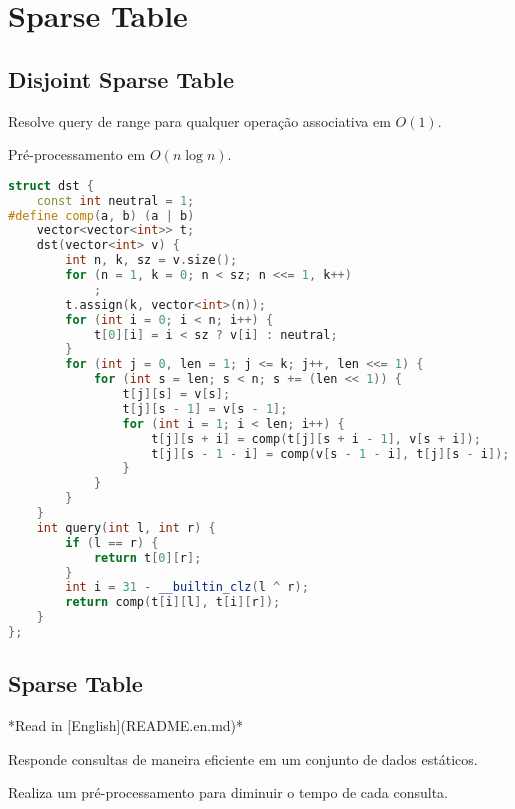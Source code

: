 \documentclass[11pt, a4paper, oneside]{book}
\begin{document}
\hfill

\section{Sparse Table}
\subsection{Disjoint Sparse Table}


Resolve query de range para qualquer operação associativa em $O(1)$.



Pré-processamento em $O(n \log n)$.
\hfill

\begin{multicols}{2}
\begin{lstlisting}[language=C++]
struct dst {
    const int neutral = 1;
#define comp(a, b) (a | b)
    vector<vector<int>> t;
    dst(vector<int> v) {
        int n, k, sz = v.size();
        for (n = 1, k = 0; n < sz; n <<= 1, k++)
            ;
        t.assign(k, vector<int>(n));
        for (int i = 0; i < n; i++) {
            t[0][i] = i < sz ? v[i] : neutral;
        }
        for (int j = 0, len = 1; j <= k; j++, len <<= 1) {
            for (int s = len; s < n; s += (len << 1)) {
                t[j][s] = v[s];
                t[j][s - 1] = v[s - 1];
                for (int i = 1; i < len; i++) {
                    t[j][s + i] = comp(t[j][s + i - 1], v[s + i]);
                    t[j][s - 1 - i] = comp(v[s - 1 - i], t[j][s - i]);
                }
            }
        }
    }
    int query(int l, int r) {
        if (l == r) {
            return t[0][r];
        }
        int i = 31 - __builtin_clz(l ^ r);
        return comp(t[i][l], t[i][r]);
    }
};
\end{lstlisting}
\end{multicols}

\hfill

\subsection{Sparse Table}


*Read in [English](README.en.md)*



Responde consultas de maneira eficiente em um conjunto de dados estáticos.\

Realiza um pré-processamento para diminuir o tempo de cada consulta.
\end{document}

